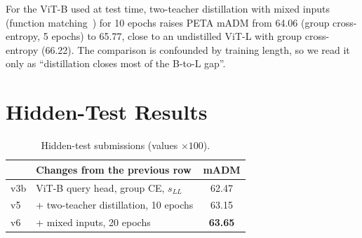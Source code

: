 \documentclass[10pt,twocolumn,letterpaper]{article}
\begin{document}
\begin{table}[t]
\centering\small
\setlength{\tabcolsep}{3pt}
\caption{Distillation and training length (PETA held out, no group cross-entropy). mADM in points, NLL terms in nats.}
\label{tab:kd}
\end{table}

For the ViT-B used at test time, two-teacher distillation with mixed inputs (function matching~\cite{patient}) for 10 epochs raises PETA mADM from 64.06 (group cross-entropy, 5 epochs) to 65.77, close to an undistilled ViT-L with group cross-entropy (66.22). The comparison is confounded by training length, so we read it only as ``distillation closes most of the B-to-L gap''.

\section{Hidden-Test Results}
\label{sec:lb}

\begin{table}[t]
\centering\small
\setlength{\tabcolsep}{3.5pt}
\begin{tabular}{@{}llc@{}}
\toprule
& Changes from the previous row & mADM \\
\midrule
v3b & ViT-B query head, group CE, $s_{LL}$ & 62.47 \\
v5 & + two-teacher distillation, 10 epochs & 63.15 \\
v6 & + mixed inputs, 20 epochs & \textbf{63.65} \\
\bottomrule
\end{tabular}
\caption{Hidden-test submissions (values $\times100$).}
\label{tab:main}
\end{table}
\end{document}
